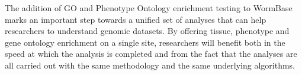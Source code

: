 \documentclass[10pt,letterpaper,twocolumn]{article}
\begin{document}




The addition of GO and Phenotype Ontology enrichment testing to WormBase marks
an important step towards a unified set of analyses that can help researchers
to understand genomic datasets. By offering tissue, phenotype and gene ontology
enrichment on a single site, researchers will benefit both in the speed at which
the analysis is completed and from the fact that the analyses are all
carried out with the same methodology and the same underlying algorithms.
\end{document}
